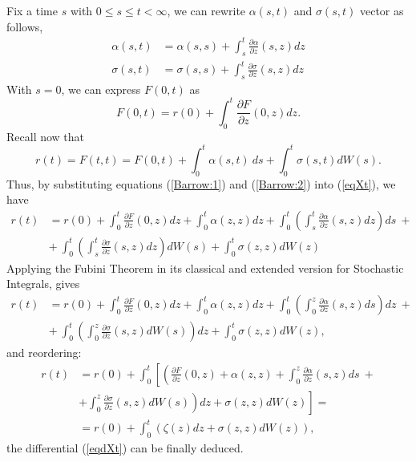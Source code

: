  \begin{demo}
 Fix a time $s$ with $0 \leq s\leq t < \infty$, we can rewrite
 $\alpha(s,t)$ and $\sigma(s,t)$ vector as follows,
 \begin{equation}
 \label{Barrow:1}
 \begin{split}
 \alpha(s,t) & = \alpha(s,s)+\int_s^t
 \frac{\partial\alpha}{\partial z} (s,z)  dz\\ 
 \sigma(s,t)  & = \sigma(s,s)+\int_s^t
 \frac{\partial\sigma}{\partial z} (s,z)  dz
 \end{split}
 \end{equation}
 With $s=0$, we can express $F(0,t)$ as
 \begin{equation}
 \label{Barrow:2}
 F(0,t) = r(0)+\int_0^t \frac{\partial F}{\partial z} (0,z) dz.
 \end{equation}
Recall now that
\begin{equation}
\label{eqXt}
r(t)=F(t,t)=F(0,t)+\int_0^t \alpha(s,t)\: ds+\int_0^t \sigma(s,t) dW(s).
\end{equation}
Thus, by substituting equations (\ref{Barrow:1}) and (\ref{Barrow:2})
into (\ref{eqXt}), we have 
 \begin{equation}
\label{Fubini1}
 \begin{split}
 r(t) & = r(0)+\int_0^t \frac{\partial F}{\partial z}(0,z) dz 
      + \int_0^t \alpha (z,z) dz +\int_0^t\left(\int_s^t
      \frac{\partial\alpha}{\partial z}(s,z) dz\right) ds\: +\\
 & +\:\int_0^t\left(\int_s^t \frac{\partial\sigma}{\partial z}(s,z)
      dz\right) dW(s) + \int_0^t \sigma(z,z) dW(z)
 \end{split}
 \end{equation}
Applying the Fubini Theorem in its classical and extended version for
Stochastic Integrals, gives
\begin{equation}
\label{Fubini}
\begin{split}
 r(t) & = r(0)+\int_0^t \frac{\partial F}{\partial z}(0,z) 
      dz+\int_0^t \alpha (z,z) dz +
      \int_0^t\left(\int_0^z \frac{\partial\alpha}{\partial z}(s,z) 
      ds\right) dz\: +\\ 
 & +\:\int_0^t\left(\int_0^z \frac{\partial\sigma}{\partial z}(s,z)
      dW(s)\right) dz + \int_0^t \sigma(z,z) dW(z),
\end{split}
\end{equation}
and reordering: 
\begin{equation}
\begin{split}
 r(t) & = r(0)+\int_0^t \left[\left(\frac{\partial F}{\partial z}(0,z)
      + \alpha (z,z)+ \int_0^z \frac{\partial\alpha}{\partial z}(s,z) ds\: +
      \right. \right.\\ 
      & + \left. \left. \int_0^z \frac{\partial\sigma}{\partial z}(s,z)
      dW(s)\right) dz + \sigma(z,z) dW(z)\right] =\\
      & = r(0)+\int_0^t \left(\zeta(z)dz + \sigma(z,z) dW(z)\right),
\end{split}
\end{equation}
the differential (\ref{eqdXt}) can be finally deduced.
\end{demo}

